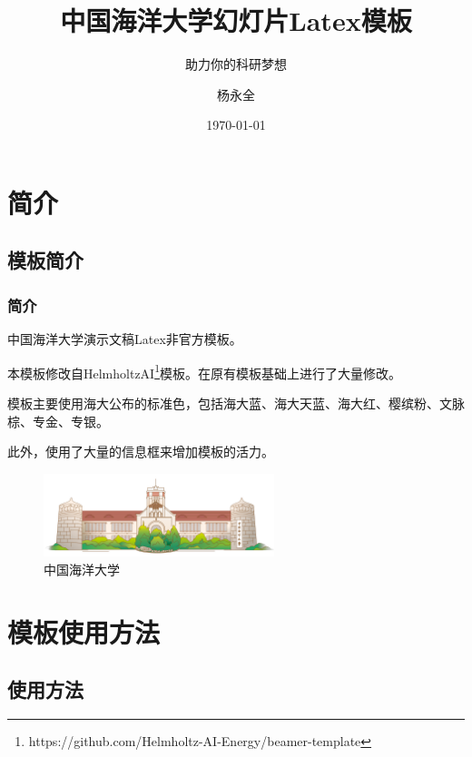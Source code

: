 \documentclass[aspectratio=169,UTF8,t]{beamer}%
\title{中国海洋大学幻灯片Latex模板}
\subtitle{助力你的科研梦想}
\author{杨永全}
\date{\today}
\institute{计算机科学与技术学院}
\begin{document}
\maketitle

\makeoutline

\section{简介}

\subsection{模板简介}

\begin{frame}
    \frametitle{简介}
    中国海洋大学演示文稿Latex非官方模板。

    本模板修改自HelmholtzAI\footnote{https://github.com/Helmholtz-AI-Energy/beamer-template}模板。在原有模板基础上进行了大量修改。

    模板主要使用海大公布的标准色，包括海大蓝、海大天蓝、海大红、樱缤粉、文脉棕、专金、专银。

    此外，使用了大量的信息框来增加模板的活力。
    \begin{center}
        \begin{figure}
        \centering
        \includegraphics[width=0.6\textwidth]{figs/ouc.png}
            \caption{中国海洋大学}
            \label{fig:ouc}
        \end{figure}
    \end{center}
    
    
\end{frame}

\section{模板使用方法}

\subsection{使用方法}
\end{document}
